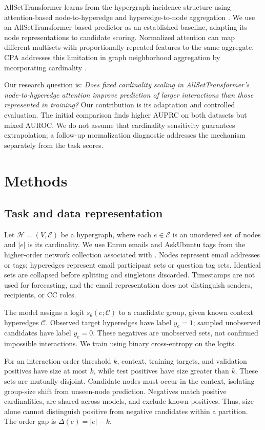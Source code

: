 \documentclass{article}
\begin{document}
AllSetTransformer learns from the hypergraph incidence structure using attention-based node-to-hyperedge and hyperedge-to-node aggregation \citep{allset}. We use an AllSetTransformer-based predictor as an established baseline, adapting its node representations to candidate scoring. Normalized attention can map different multisets with proportionally repeated features to the same aggregate. CPA addresses this limitation in graph neighborhood aggregation by incorporating cardinality \citep{cpa}.

Our research question is: \emph{Does fixed cardinality scaling in AllSetTransformer's node-to-hyperedge attention improve prediction of larger interactions than those represented in training?} Our contribution is its adaptation and controlled evaluation. The initial comparison finds higher AUPRC on both datasets but mixed AUROC. We do not assume that cardinality sensitivity guarantees extrapolation; a follow-up normalization diagnostic addresses the mechanism separately from the task scores.

\section{Methods}
\subsection{Task and data representation}
Let $\mathcal H=(V,\mathcal E)$ be a hypergraph, where each $e\in\mathcal E$ is an unordered set of nodes and $|e|$ is its cardinality. We use Enron emails and AskUbuntu tags from the higher-order network collection associated with \citet{benson}. Nodes represent email addresses or tags; hyperedges represent email participant sets or question tag sets. Identical sets are collapsed before splitting and singletons discarded. Timestamps are not used for forecasting, and the email representation does not distinguish senders, recipients, or CC roles.

The model assigns a logit $s_\theta(e;\mathcal C)$ to a candidate group, given known context hyperedges $\mathcal C$. Observed target hyperedges have label $y_e=1$; sampled unobserved candidates have label $y_e=0$. These negatives are unobserved sets, not confirmed impossible interactions. We train using binary cross-entropy on the logits.

For an interaction-order threshold $k$, context, training targets, and validation positives have size at most $k$, while test positives have size greater than $k$. These sets are mutually disjoint. Candidate nodes must occur in the context, isolating group-size shift from unseen-node prediction. Negatives match positive cardinalities, are shared across models, and exclude known positives. Thus, size alone cannot distinguish positive from negative candidates within a partition. The order gap is $\Delta(e)=|e|-k$.
\end{document}
